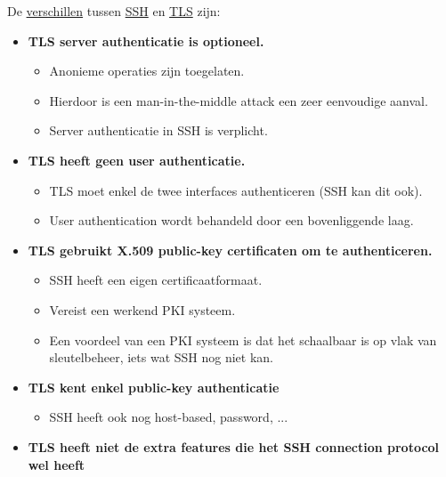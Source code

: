 \documentclass{report}
\begin{document}
	De \underline{verschillen} tussen \underline{SSH} en \underline{TLS} zijn:
	\begin{itemize}
		\item \textbf{TLS server authenticatie is optioneel.} 
			\begin{itemize}
				\item Anonieme operaties zijn toegelaten.
				\item Hierdoor is een man-in-the-middle attack een zeer eenvoudige aanval.
				\item Server authenticatie in SSH is verplicht.
			\end{itemize}
		\item \textbf{TLS heeft geen user authenticatie.}
			\begin{itemize}
				\item TLS moet enkel de twee interfaces authenticeren (SSH kan dit ook).
				\item User authentication wordt behandeld door een bovenliggende laag.
			\end{itemize}
		\item \textbf{TLS gebruikt X.509 public-key certificaten om te authenticeren.}
			\begin{itemize}
				\item SSH heeft een eigen certificaatformaat.
				\item Vereist een werkend PKI systeem.
				\item Een voordeel van een PKI systeem is dat het schaalbaar is op vlak van sleutelbeheer, iets wat SSH nog niet kan. 
			\end{itemize}
		\item \textbf{TLS kent enkel public-key authenticatie}
			\begin{itemize}
				\item SSH heeft ook nog host-based, password, ...
			\end{itemize}
		\item \textbf{TLS heeft niet de extra features die het SSH connection protocol wel heeft} 
	\end{itemize}
\end{document}
